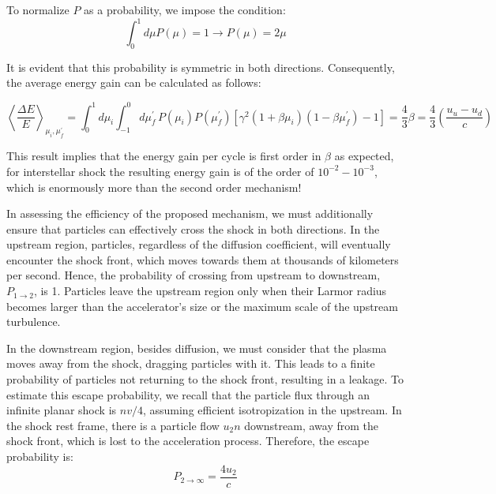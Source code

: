 To normalize \( P \) as a probability, we impose the condition:
%
\begin{equation}
\int_0^1 d\mu P(\mu) = 1 \rightarrow P(\mu) = 2\mu 
\end{equation}

It is evident that this probability is symmetric in both directions. Consequently, the average energy gain can be calculated as follows:
%
\begin{remark}
\begin{equation}
\left\langle \frac{\Delta E}{E} \right\rangle_{\mu_i,\mu_f^\prime} \!\!\! = \! \int_0^1 \! d\mu_i \int_{-1}^0 \! d\mu^\prime_f \, P(\mu_i)P(\mu_f^\prime)\left[ \gamma^2(1+\beta\mu_i)(1-\beta\mu_f^\prime)-1 \right] 
= \frac{4}{3} \beta = \frac{4}{3} \left(\frac{u_u - u_d}{c} \right)
\end{equation}
\end{remark}

This result implies that the energy gain per cycle is first order in $\beta$ as expected, for interstellar shock the resulting energy gain is of the order of \( 10^{-2}-10^{-3} \), which is enormously more than the second order mechanism! 

In assessing the efficiency of the proposed mechanism, we must additionally ensure that particles can effectively cross the shock in both directions. 
%
In the upstream region, particles, regardless of the diffusion coefficient, will eventually encounter the shock front, which moves towards them at thousands of kilometers per second. Hence, the probability of crossing from upstream to downstream, \( P_{1 \rightarrow 2} \), is 1. Particles leave the upstream region only when their Larmor radius becomes larger than the accelerator's size or the maximum scale of the upstream turbulence.

In the downstream region, besides diffusion, we must consider that the plasma moves away from the shock, dragging particles with it. This leads to a finite probability of particles not returning to the shock front, resulting in a leakage. To estimate this escape probability, we recall that the particle flux through an infinite planar shock is \( n v / 4 \), assuming efficient isotropization in the upstream. In the shock rest frame, there is a particle flow \( u_2 n \) downstream, away from the shock front, which is lost to the acceleration process. Therefore, the escape probability is:
%
\begin{equation}
P_{2 \rightarrow \infty} = \frac{4 u_2}{c}
\end{equation}


